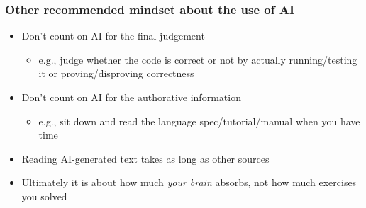 \documentclass[12pt,dvipdfmx]{beamer}
\begin{document}
\begin{frame}
  \frametitle{Other recommended mindset about the use of AI}
  \begin{itemize}
  \item Don't count on AI for the final judgement
    \begin{itemize}
    \item e.g., judge whether the code is correct or not
      by actually running/testing it or proving/disproving correctness
    \end{itemize}
  \item Don't count on AI for the authorative information
    \begin{itemize}
    \item e.g., sit down and read the language spec/tutorial/manual when you have time
    \end{itemize}
  \item Reading AI-generated text takes as long as other sources
  \item Ultimately it is about how much {\it your brain} absorbs, not how much exercises you solved
  \end{itemize}
\end{frame}
\end{document}
